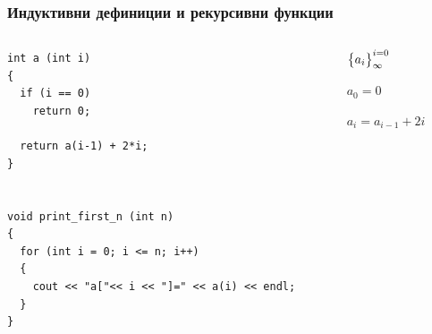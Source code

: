 \documentclass{beamer}
\begin{document}
\begin{frame}[fragile]
\frametitle{Индуктивни дефиниции и рекурсивни функции}


\begin{columns}[t]
  \begin{column}{0.7\textwidth}

\begin{lstlisting}
int a (int i)
{
  if (i == 0)
    return 0;

  return a(i-1) + 2*i;
}


void print_first_n (int n)
{
  for (int i = 0; i <= n; i++)
  {
    cout << "a["<< i << "]=" << a(i) << endl;
  }
}
\end{lstlisting}


  \end{column}
  \begin{column}{0.3\textwidth}
\begin{flushleft}

  $\big{\{}a_i\big{\}}_\infty^{i=0}$

  \vspace{10px}

  $a_0 = 0$

  $a_i = a_{i-1} + 2i$



\end{flushleft}
  \end{column}
\end{columns}

\end{frame}
\end{document}
